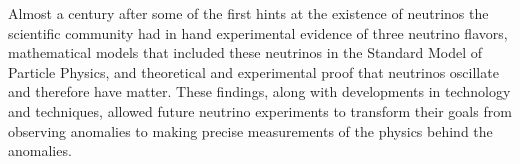 Almost a century after some of the first hints at the existence of neutrinos the scientific community had in hand experimental evidence of three neutrino flavors, mathematical models that included these neutrinos in the Standard Model of Particle Physics, and theoretical and experimental proof that neutrinos oscillate and therefore have matter.
These findings, along with developments in technology and techniques, allowed future neutrino experiments to transform their goals from observing anomalies to making precise measurements of the physics behind the anomalies.




